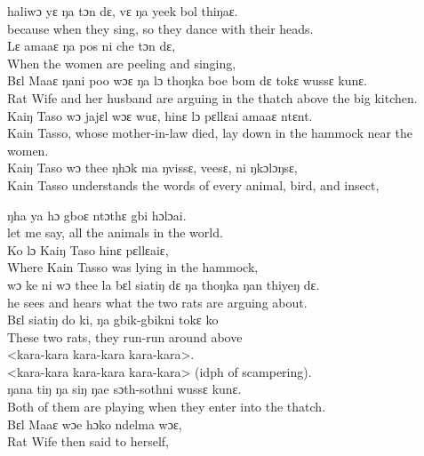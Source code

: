 haliwɔ yɛ ŋa tɔn dɛ, vɛ ŋa yeek bol thiŋaɛ.\\
because when they sing, so they dance with their heads.\\

Lɛ amaaɛ ŋa pos ni che tɔn dɛ,\\ 
When the women are peeling and singing,\\ 

Bɛl Maaɛ ŋani poo wɔɛ ŋa lɔ thoŋka boe bom dɛ tokɛ wussɛ kunɛ.\\
Rat Wife and her husband are arguing in the thatch above the big kitchen.\\

Kaiŋ Taso wɔ jajɛl wɔɛ wuɛ, hinɛ lɔ pɛllɛai amaaɛ ntɛnt.\\
Kain Tasso, whose mother-in-law died, lay down in the hammock near the women.\\

Kaiŋ Taso wɔ thee ŋhɔk ma ŋvissɛ, veesɛ, ni ŋkɔlɔŋsɛ,\\
Kain Tasso understands the words of every animal, bird, and insect,\newpage

ŋha ya hɔ gboɛ ntɔthɛ gbi hɔlɔai.\\
let me say, all the animals in the world.\\

Ko lɔ Kaiŋ Taso hinɛ pɛllɛaiɛ,\\ 
Where Kain Tasso was lying in the hammock,\\ 

wɔ ke ni wɔ thee la bɛl siatiŋ dɛ ŋa thoŋka ŋan thiyeŋ dɛ.\\
he sees and hears what the two rats are arguing about.\\

Bɛl siatiŋ do ki, ŋa gbik-gbikni tokɛ ko\\
These two rats, they run-run around above\\

<kara-kara kara-kara kara-kara>.\\
<kara-kara kara-kara kara-kara> (idph of scampering).\\

ŋana tiŋ ŋa siŋ ŋae sɔth-sothni wussɛ kunɛ.\\
Both of them are playing when they enter into the thatch.\\

Bɛl Maaɛ wɔe hɔko ndelma wɔɛ,\\
Rat Wife then said to herself,\\

